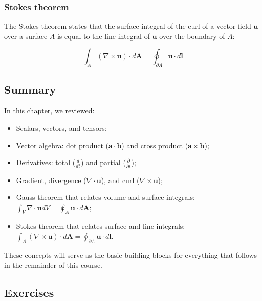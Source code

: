 \documentclass[12pt]{article}
\numberwithin{equation}{section}
\numberwithin{figure}{section}
\numberwithin{table}{section}
\begin{document}
\subsubsection{Stokes theorem}

The Stokes theorem states that the surface integral of the curl of a
vector field $\mathbf{u}$ over a surface $A$ is equal to the line integral of
$\mathbf{u}$ over the boundary of $A$:

\begin{equation}
  \int_A (\nabla \times \mathbf{u}) \cdot d\mathbf{A} = \oint_{\partial A} \mathbf{u} \cdot d\mathbf{l}
\end{equation}

\subsection{Summary}

In this chapter, we reviewed:

\begin{itemize}
  \item Scalars, vectors, and tensors;
  \item Vector algebra: dot product ($\mathbf{a} \cdot \mathbf{b}$) and cross
  product ($\mathbf{a} \times \mathbf{b}$);
  \item Derivatives: total ($\frac{d}{dt}$) and partial ($\frac{\partial}{\partial t}$);
  \item Gradient, divergence ($\nabla \cdot \mathbf{u}$), and curl ($\nabla \times \mathbf{u}$);
  \item Gauss theorem that relates volume and surface integrals:
  $\int_V \nabla \cdot \mathbf{u} dV = \oint_A \mathbf{u} \cdot d\mathbf{A}$;
  \item Stokes theorem that relates surface and line integrals:
  $\int_A (\nabla \times \mathbf{u}) \cdot d\mathbf{A} = \oint_{\partial A} \mathbf{u} \cdot d\mathbf{l}$.
\end{itemize}

These concepts will serve as the basic building blocks for everything that
follows in the remainder of this course.

\subsection{Exercises}
\end{document}
